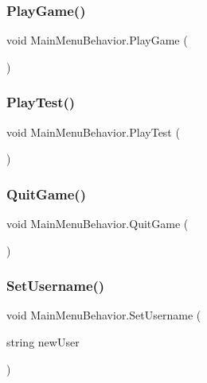 \subsubsection{\texorpdfstring{PlayGame()}{PlayGame()}}
{\footnotesize\ttfamily void Main\+Menu\+Behavior.\+Play\+Game (\begin{DoxyParamCaption}{ }\end{DoxyParamCaption})}

\mbox{\label{class_main_menu_behavior_a781e8e3a21a016ef2c3c6410d20c1026}} 
\subsubsection{\texorpdfstring{PlayTest()}{PlayTest()}}
{\footnotesize\ttfamily void Main\+Menu\+Behavior.\+Play\+Test (\begin{DoxyParamCaption}{ }\end{DoxyParamCaption})}

\mbox{\label{class_main_menu_behavior_a90c233e4e405f363cdde95ecc0532b17}} 
\subsubsection{\texorpdfstring{QuitGame()}{QuitGame()}}
{\footnotesize\ttfamily void Main\+Menu\+Behavior.\+Quit\+Game (\begin{DoxyParamCaption}{ }\end{DoxyParamCaption})}

\mbox{\label{class_main_menu_behavior_a248fc73ca12d3bd0ded59da658a53df8}} 
\subsubsection{\texorpdfstring{SetUsername()}{SetUsername()}}
{\footnotesize\ttfamily void Main\+Menu\+Behavior.\+Set\+Username (\begin{DoxyParamCaption}\item[{string}]{new\+User }\end{DoxyParamCaption})}



